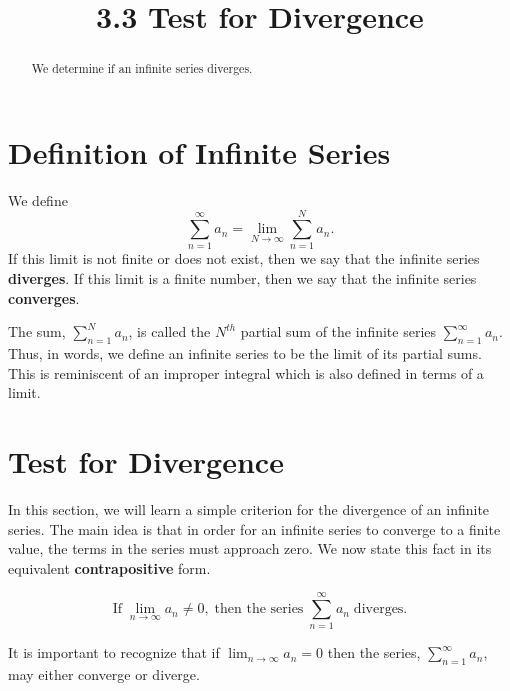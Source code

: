 \documentclass{ximera}
\title{3.3 Test for Divergence}
\begin{document}
\begin{abstract}
We determine if an infinite series diverges.
\end{abstract}

\maketitle

\section{Definition of Infinite Series}

\begin{definition}
We define
\[\sum_{n=1}^\infty a_n = \lim_{N \to \infty} \sum_{n=1}^N a_n.\]
If this limit is not finite or does not exist, then we say that the infinite series \textbf{diverges}.
If this limit is a finite number, then we say that the infinite series \textbf{converges}.
\end{definition}

\begin{remark}
The sum, $\displaystyle{\sum_{n=1}^N a_n}$, is called the $N^{th}$ partial sum of the infinite series
$\displaystyle{\sum_{n=1}^\infty a_n}$. Thus, in words, we define an infinite series to be the limit of its partial sums.
This is reminiscent of an improper integral which is also defined in terms of a limit.
\end{remark}

\section{Test for Divergence}

In this section, we will learn a simple criterion for the divergence of an infinite series.
The main idea is that in order for an infinite series to converge to a finite value, the terms in the series
must approach zero. We now state this fact in its equivalent \textbf{contrapositive} form.


\begin{theorem}


\[
\text{If}  \; \lim_{n\to \infty} a_n \neq 0,
\; \text{then the series} \;
\sum_{n=1}^\infty a_n \;
\text{diverges.}
\]

\end{theorem}

\begin{remark}
It is important to recognize that if $\displaystyle{\lim_{n \to \infty} a_n = 0}$ then the series, $\displaystyle{\sum_{n=1}^\infty a_n}$, may either converge or diverge.
\end{remark}
\end{document}
